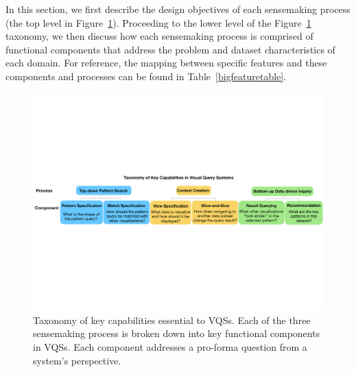 \par In this section, we first describe the design objectives of each sensemaking process (the top level in Figure~\ref{fig:taxonomy}). Proceeding to the lower level of the Figure~\ref{fig:taxonomy} taxonomy, we then discuss how each sensemaking process is comprised of functional components that address the problem and dataset characteristics of each domain. For reference, the mapping between specific \zvpp features and these components and processes can be found in  Table~\ref{bigfeaturetable}.
    \begin{figure}[ht!]
    \centering
    \includegraphics[width=0.9\linewidth]{figures/taxonomy.pdf}
    \caption{Taxonomy of key capabilities essential to VQSs. Each of the three sensemaking process is broken down into key functional components in VQSs. Each component addresses a pro-forma question from a system's perspective.} %
    \label{fig:taxonomy}
    \vspace*{-10pt}
    \end{figure}
